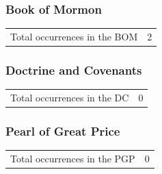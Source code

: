 	\subsubsection{Book of Mormon} %
		\label{COMPOUND-BOM}
	
		\begin{tabular}{ll}
			Total occurrences in the BOM & 2
		\end{tabular}
		
		\begin{compactdesc}
			\item[{\hyperref[2NEPHI-2-11]{2 Nephi 2:11}}]
			\item[{\hyperref[ALMA-43-13]{Alma 43:13}}]
		\end{compactdesc}
		
	\subsubsection{Doctrine and Covenants} %
		\label{COMPOUND-DC}
	
		\begin{tabular}{ll}
			Total occurrences in the DC & 0
		\end{tabular}
		
		
	\subsubsection{Pearl of Great Price} %
		\label{COMPOUND-PGP}
	
		\begin{tabular}{ll}
			Total occurrences in the PGP & 0
		\end{tabular}
		
		

	
